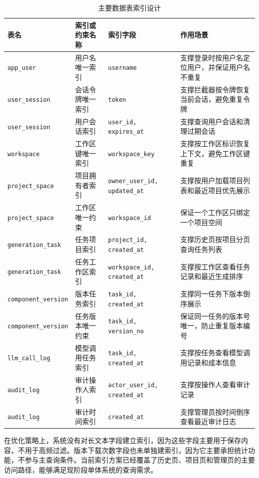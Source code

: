 \begin{table}[!htbp]
\centering
\caption{主要数据表索引设计}
\label{tab:chapter4-index-design}
\footnotesize
\begin{tabular}{@{}p{}p{}p{}p{}@{}}
\toprule
表名 & 索引或约束名称 & 索引字段 & 作用场景 \\
\midrule
\texttt{app\_user} & 用户名唯一索引 & \texttt{username} & 支撑登录时按用户名定位用户，并保证用户名不重复 \\
\texttt{user\_session} & 会话令牌唯一索引 & \texttt{token} & 支撑拦截器按令牌恢复当前会话，避免重复令牌 \\
\texttt{user\_session} & 用户会话索引 & \texttt{user\_id, expires\_at} & 支撑查询用户会话和清理过期会话 \\
\texttt{workspace} & 工作区键唯一索引 & \texttt{workspace\_key} & 支撑按工作区标识恢复上下文，避免工作区键重复 \\
\texttt{project\_space} & 项目拥有者索引 & \texttt{owner\_user\_id, updated\_at} & 支撑按用户加载项目列表和最近项目优先展示 \\
\texttt{project\_space} & 工作区唯一约束 & \texttt{workspace\_id} & 保证一个工作区只绑定一个项目空间 \\
\texttt{generation\_task} & 任务项目索引 & \texttt{project\_id, created\_at} & 支撑历史页按项目分页查询任务列表 \\
\texttt{generation\_task} & 任务工作区索引 & \texttt{workspace\_id, created\_at} & 支撑按工作区查看任务记录和最近生成排序 \\
\texttt{component\_version} & 版本任务索引 & \texttt{task\_id, created\_at} & 支撑同一任务下版本倒序展示 \\
\texttt{component\_version} & 任务版本唯一约束 & \texttt{task\_id, version\_no} & 保证同一任务的版本号唯一，防止重复版本编号 \\
\texttt{llm\_call\_log} & 模型调用任务索引 & \texttt{task\_id, created\_at} & 支撑按任务查看模型调用记录和成本信息 \\
\texttt{audit\_log} & 审计操作人索引 & \texttt{actor\_user\_id, created\_at} & 支撑按操作人查看审计记录 \\
\texttt{audit\_log} & 审计时间索引 & \texttt{created\_at} & 支撑管理员按时间倒序查看最近审计日志 \\
\bottomrule
\end{tabular}
\end{table}

在优化策略上，系统没有对长文本字段建立索引，因为这些字段主要用于保存内容，不用于高频过滤。版本下载次数字段也未单独建索引，因为它主要承担统计功能，不参与主查询条件。当前索引方案已经覆盖了历史页、项目页和管理页的主要访问路径，能够满足现阶段单体系统的查询需求。

